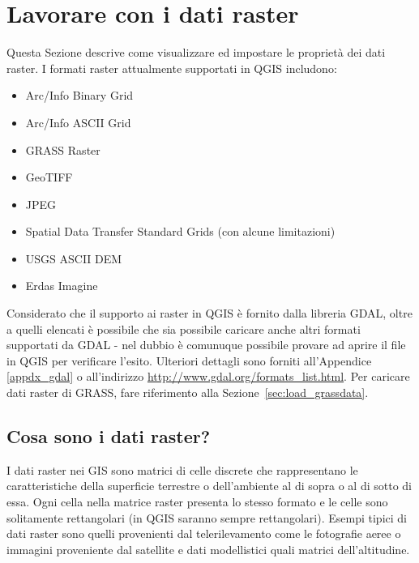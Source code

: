 
\section{Lavorare con i dati raster}\label{label_raster}


Questa Sezione descrive come visualizzare ed impostare le proprietà dei dati
raster. I formati raster attualmente supportati in QGIS includono:

\begin{itemize}
\item Arc/Info Binary Grid
\item Arc/Info ASCII Grid
\item GRASS Raster
\item GeoTIFF
\item JPEG
\item Spatial Data Transfer Standard Grids (con alcune limitazioni)
\item USGS ASCII DEM
\item Erdas Imagine
\end{itemize}

Considerato che il supporto ai raster in QGIS è fornito dalla libreria GDAL,
oltre a quelli elencati è possibile che sia possibile caricare anche altri
formati supportati da GDAL - nel dubbio è comunuque possibile provare ad aprire il file
in QGIS per verificare l'esito. Ulteriori dettagli sono forniti all'Appendice \ref{appdx_gdal}
 o all'indirizzo
\url{http://www.gdal.org/formats_list.html}. Per caricare dati raster di
GRASS, fare riferimento alla Sezione~\ref{sec:load_grassdata}.

\subsection{Cosa sono i dati raster?}\label{label_whatsraster}

I dati raster nei GIS sono matrici di celle discrete che rappresentano le
caratteristiche della superficie terrestre o dell'ambiente al di sopra o al di sotto
di essa. Ogni cella nella matrice raster presenta lo stesso formato e le celle
sono solitamente rettangolari (in QGIS saranno sempre rettangolari). Esempi
tipici di dati raster sono quelli provenienti dal telerilevamento come le
fotografie aeree o immagini proveniente dal satellite e dati
modellistici quali matrici dell’altitudine.

